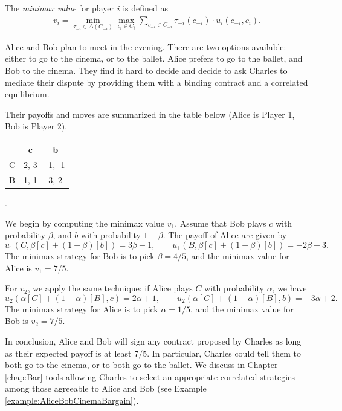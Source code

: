\begin{definition}[Minimax]
The \emph{minimax value} for player $i$ is defined as
\begin{align*}
v_i = \min_{\tau_{-i} \in \Delta(C_{-i})} \max_{c_i \in C_i} \sum_{c_{-i} \in C_{-i}} \tau_{-i}(c_{-i}) \cdot u_i(c_{-i}, c_i).
\end{align*}
\end{definition}
\begin{example}
\label{ch5:ex:minimax}
Alice and Bob plan to meet in the evening. There are two options available: either to go to the cinema, or to the ballet.
Alice prefers to go to the ballet, and Bob to the cinema. They find it hard to decide and decide to ask Charles to mediate their dispute by providing them with a binding contract and a correlated equilibrium.

Their payoffs and moves are summarized in the table below (Alice is Player 1, Bob is Player 2).
\begin{center}
\begin{tabular}{c | c  c}
& c & b\\
\hline
C & 2, 3 & -1, -1  \\
B & 1, 1 & 3, 2
\end{tabular}
.
\end{center}

We begin by computing the minimax value $v_1$. Assume that Bob plays $c$ with probability $\beta$, and $b$ with probability $1-\beta$.
The payoff of Alice are given by
$$ u_{1}(C, \beta[c] + (1-\beta)[b]) = 3\beta - 1, \qquad u_{1}(B, \beta[c] + (1-\beta)[b]) = -2\beta + 3.  $$
The minimax strategy for Bob is to pick $\beta = 4/5$, and the minimax value for Alice is $v_1 = 7/5$.

For $v_2$, we apply the same technique: if Alice plays $C$ with probability $\alpha$, we have
$$ u_{2}(\alpha [C] + (1-\alpha)[B], c) = 2 \alpha + 1, \qquad u_{2}(\alpha [C] + (1-\alpha)[B], b) = -3\alpha + 2.  $$
The minimax strategy for Alice is to pick $\alpha = 1/5$, and the minimax value for Bob is $v_2 = 7/5$.

In conclusion, Alice and Bob will sign any contract proposed by Charles as long as their expected payoff is at least $7/5$. In particular, Charles could tell them to both go to the cinema, or to both go to the ballet.
We  discuss in Chapter \ref{chap:Bar} tools allowing Charles to select an appropriate correlated strategies among those agreeable to Alice and Bob (see Example \ref{example:AliceBobCinemaBargain}).

\end{example}

